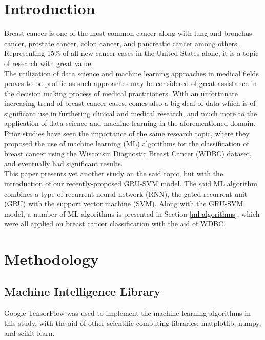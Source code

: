 \section{Introduction}
Breast cancer is one of the most common cancer along with lung and bronchus cancer, prostate cancer, colon cancer, and pancreatic cancer among others\cite{nci2017}. Representing 15\% of all new cancer cases in the United States alone\cite{surveillance}, it is a topic of research with great value.\\
\indent	The utilization of data science and machine learning approaches in medical fields proves to be prolific as such approaches may be considered of great assistance in the decision making process of medical practitioners. With an unfortunate increasing trend of breast cancer cases\cite{surveillance}, comes also a big deal of data which is of significant use in furthering clinical and medical research, and much more to the application of data science and machine learning in the aforementioned domain.\\
\indent	Prior studies have seen the importance of the same research topic\cite{salama2012breast, zafiropoulos2006support}, where they proposed the use of machine learning (ML) algorithms for the classification of breast cancer using the Wisconsin Diagnostic Breast Cancer (WDBC) dataset\cite{wolberg1992breast}, and eventually had significant results.\\
\indent	This paper presents yet another study on the said topic, but with the introduction of our recently-proposed GRU-SVM model\cite{agarap2017neural}. The said ML algorithm combines a type of recurrent neural network (RNN), the gated recurrent unit (GRU)\cite{Cho} with the support vector machine (SVM)\cite{Cortes}. Along with the GRU-SVM model, a number of ML algorithms is presented in Section \ref{ml-algorithms}, which were all applied on breast cancer classification with the aid of WDBC\cite{wolberg1992breast}.

\section{Methodology}

\subsection{Machine Intelligence Library}
Google TensorFlow\cite{tensorflow2015-whitepaper} was used to implement the machine learning algorithms in this study, with the aid of other scientific computing libraries: matplotlib\cite{Hunter:2007}, numpy\cite{walt2011numpy}, and scikit-learn\cite{scikit-learn}. 

